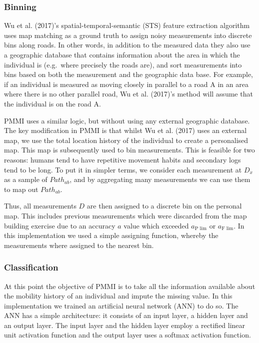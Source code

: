 \documentclass[man]{apa6}
\theoremstyle{definition}
\theoremstyle{definition}
\theoremstyle{definition}
\theoremstyle{remark}
\begin{document}
\subsubsection{Binning}\label{binning}

Wu et al. (2017)'s spatial-temporal-semantic (STS) feature extraction
algorithm uses map matching as a ground truth to assign noisy
measurements into discrete bins along roads. In other words, in addition
to the measured data they also use a geographic database that contains
information about the area in which the individual is (e.g.~where
precisely the roads are), and sort measurements into bins based on both
the measurement and the geographic data base. For example, if an
individual is measured as moving closely in parallel to a road A in an
area where there is no other parallel road, Wu et al. (2017)'s method
will assume that the individual is on the road A.

PMMI uses a similar logic, but without using any external geographic
database. The key modification in PMMI is that whilst Wu et al. (2017)
uses an external map, we use the total location history of the
individual to create a personalised map. This map is subsequently used
to bin measurements. This is feasible for two reasons: humans tend to
have repetitive movement habits and secondary logs tend to be long. To
put it in simpler terms, we consider each measurement at \(D_x\) as a
sample of \(Path_{ab}\), and by aggregating many measurements we can use
them to map out \(Path_{ab}\).

Thus, all measurements \(D\) are then assigned to a discrete bin on the
personal map. This includes previous measurements which were discarded
from the map building exercise due to an accuracy \(a\) value which
exceeded \(a_{\text{P lim}}\) or \(a_{\text{F lim}}\). In this
implementation we used a simple assigning function, whereby the
measurements where assigned to the nearest bin.

\subsubsection{Classification}\label{classification}

At this point the objective of PMMI is to take all the information
available about the mobility history of an individual and impute the
missing value. In this implementation we trained an artificial neural
network (ANN) to do so. The ANN has a simple architecture: it consists
of an input layer, a hidden layer and an output layer. The input layer
and the hidden layer employ a rectified linear unit activation function
and the output layer uses a softmax activation function.
\end{document}

